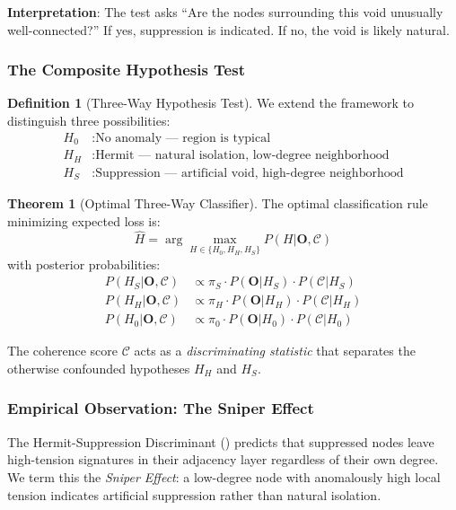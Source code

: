 \documentclass[12pt,a4paper]{article}
\theoremstyle{definition}
\newtheorem{definition}{Definition}[section]
\newtheorem{theorem}{Theorem}[section]
\theoremstyle{remark}
\begin{document}
\textbf{Interpretation}: The test asks ``Are the nodes surrounding this void unusually well-connected?'' If yes, suppression is indicated. If no, the void is likely natural.

\subsubsection{The Composite Hypothesis Test}

\begin{definition}[Three-Way Hypothesis Test]
We extend the framework to distinguish three possibilities:
\begin{align}
    H_0 &: \text{No anomaly — region is typical} \\
    H_H &: \text{Hermit — natural isolation, low-degree neighborhood} \\
    H_S &: \text{Suppression — artificial void, high-degree neighborhood}
\end{align}
\end{definition}

\begin{theorem}[Optimal Three-Way Classifier]
\label{thm:three-way}
The optimal classification rule minimizing expected loss is:
\begin{equation}
    \boxed{
    \hat{H} = \arg\max_{H \in \{H_0, H_H, H_S\}} P(H | \mathbf{O}, \mathcal{C})
    }
\end{equation}
with posterior probabilities:
\begin{align}
    P(H_S | \mathbf{O}, \mathcal{C}) &\propto \pi_S \cdot P(\mathbf{O} | H_S) \cdot P(\mathcal{C} | H_S) \\
    P(H_H | \mathbf{O}, \mathcal{C}) &\propto \pi_H \cdot P(\mathbf{O} | H_H) \cdot P(\mathcal{C} | H_H) \\
    P(H_0 | \mathbf{O}, \mathcal{C}) &\propto \pi_0 \cdot P(\mathbf{O} | H_0) \cdot P(\mathcal{C} | H_0)
\end{align}
\end{theorem}

The coherence score $\mathcal{C}$ acts as a \emph{discriminating statistic} that separates the otherwise confounded hypotheses $H_H$ and $H_S$.

\subsubsection{Empirical Observation: The Sniper Effect}

The Hermit-Suppression Discriminant () predicts that suppressed nodes leave high-tension signatures in their adjacency layer regardless of their own degree. We term this the \emph{Sniper Effect}: a low-degree node with anomalously high local tension indicates artificial suppression rather than natural isolation.
\end{document}
